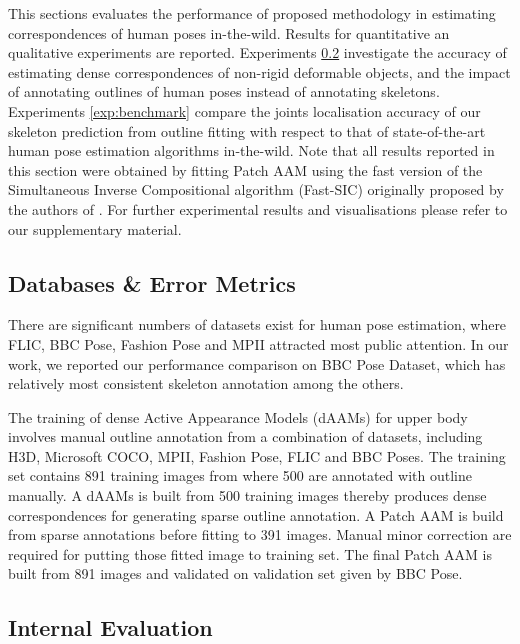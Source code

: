This sections evaluates the performance of proposed methodology in estimating correspondences of human poses in-the-wild. Results for quantitative an qualitative experiments are reported. Experiments \ref{exp:internal} investigate the accuracy of estimating dense correspondences of non-rigid deformable objects, and the impact of annotating outlines of human poses instead of annotating skeletons. Experiments \ref{exp:benchmark} compare the joints localisation accuracy of our skeleton prediction from outline fitting with respect to that of state-of-the-art human pose estimation algorithms in-the-wild. Note that all results reported in this section were obtained by fitting Patch AAM using the fast version of the Simultaneous Inverse Compositional algorithm (Fast-SIC) originally proposed by the authors of \cite{Papandreou2008}. For further experimental results and visualisations please refer to our supplementary material.

\subsection{Databases \& Error Metrics}
There are significant numbers of datasets exist for human pose estimation, where FLIC\cite{}, BBC Pose\cite{}, Fashion Pose\cite{} and MPII\cite{} attracted most public attention. In our work, we reported our performance comparison on BBC Pose Dataset\cite{}, which has relatively most consistent skeleton annotation among the others. 

The training of dense Active Appearance Models (dAAMs) for upper body involves manual outline annotation from a combination of datasets, including H3D\cite{}, Microsoft COCO\cite{}, MPII\cite{}, Fashion Pose\cite{}, FLIC\cite{} and BBC Poses\cite{}. The training set contains 891 training images from where 500 are annotated with outline manually. A dAAMs is built from 500 training images thereby produces dense correspondences for generating sparse outline annotation. A Patch AAM is build from sparse annotations before fitting to 391 images. Manual minor correction are required for putting those fitted image to training set. The final Patch AAM is built from 891 images and validated on validation set given by BBC Pose.



\subsection{Internal Evaluation}
\label{exp:internal}

